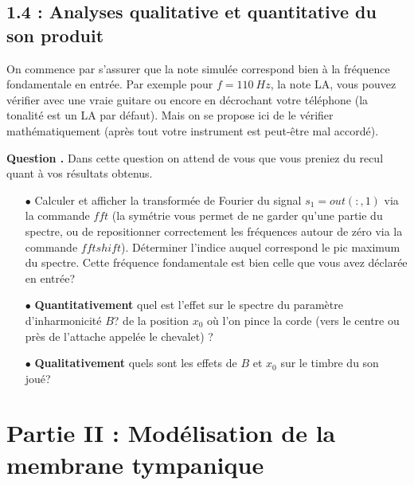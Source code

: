 \documentclass[a4,12pt]{article}
\newcounter{Nbquestion}
\newcommand*\question{%
\stepcounter{Nbquestion}%
\textbf{Question \theNbquestion. }}
\begin{document}
  \subsection*{1.4 : Analyses qualitative et quantitative du son produit}

  On commence par s'assurer que la note simulée correspond bien à la fréquence fondamentale en entrée. Par exemple pour $f=110~Hz$, la note LA, vous pouvez vérifier avec une vraie guitare ou encore en décrochant votre téléphone (la tonalité est un LA par défaut). Mais on se propose ici de le vérifier mathématiquement (après tout votre instrument est peut-être mal accordé). 


  \question Dans cette question on attend de vous que vous preniez du recul quant à vos résultats obtenus.\\

  \begin{itemize}
    \item[$\bullet$] Calculer et afficher la transformée de Fourier du signal $s_1=out(:,1)$ via la commande $fft$ 	(la symétrie vous permet de ne garder qu'une partie du spectre, ou de repositionner correctement les 		fréquences autour de zéro via la commande $fftshift$). Déterminer l'indice auquel correspond le pic maximum 	du spectre. Cette fréquence fondamentale est bien celle que vous avez déclarée en entrée?\\ 
    \item[$\bullet$] \textbf{Quantitativement} quel est l'effet sur le spectre du paramètre d'inharmonicité $B$? de 	la position $x_0$ où l'on pince la corde (vers le centre ou près de l'attache appelée le chevalet) ? \\ 
    \item[$\bullet$] \textbf{Qualitativement} quels sont les effets de $B$ et $x_0$ sur le timbre du son joué?\end{itemize} 


  \newpage


  \section*{Partie II : Modélisation de la membrane tympanique}
\end{document}

